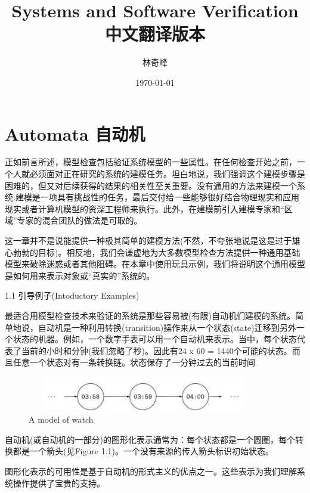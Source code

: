 \documentclass{book}
\begin{document}
\title{Systems and Software Verification中文翻译版本}
\author{林奇峰}
\date{\today}
\maketitle
    \chapter{Automata 自动机}

    正如前言所述，模型检查包括验证系统模型的一些属性。在任何检查开始之前，一个人就必须面对正在研究的系统的建模任务。坦白地说，我们强调这个建模步骤是困难的，但又对后续获得的结果的相关性至关重要。没有通用的方法来建模一个系统:建模是一项具有挑战性的任务，最后交付给一些能够很好结合物理现实和应用现实或者计算机模型的资深工程师来执行。此外，在建模前引入建模专家和“区域”专家的混合团队的做法是可取的。

    这一章并不是说能提供一种极其简单的建模方法(不然，不夸张地说是这是过于雄心勃勃的目标)。相反地，我们会谦虚地为大多数模型检查方法提供一种通用基础模型来破除迷惑或者其他阻碍。在本章中使用玩具示例，我们将说明这个通用模型是如何用来表示对象或“真实的”系统的。

1.1 引导例子(Intoductory Examples)

    最适合用模型检查技术来验证的系统是那些容易被(有限)自动机们建模的系统。简单地说，自动机是一种利用转换(transition)操作来从一个状态(state)迁移到另外一个状态的机器。例如，一个数字手表可以用一个自动机来表示。当中，每个状态代表了当前的小时和分钟(我们忽略了秒)。因此有24 x 60 = 1440个可能的状态。而且任意一个状态对有一条转换链。状态保存了一分钟过去的当前时间
    \begin{figure}
    \centering
    \includegraphics[height=0.6in,width=4.0in]{1_1.jpg}
    \caption{A model of watch}
    \end{figure}

    自动机(或自动机的一部分)的图形化表示通常为：每个状态都是一个圆圈，每个转换都是一个箭头(见Figure 1.1)。一个没有来源的传入箭头标识初始状态。

    图形化表示的可用性是基于自动机的形式主义的优点之一。这些表示为我们理解系统操作提供了宝贵的支持。
\end{document}
